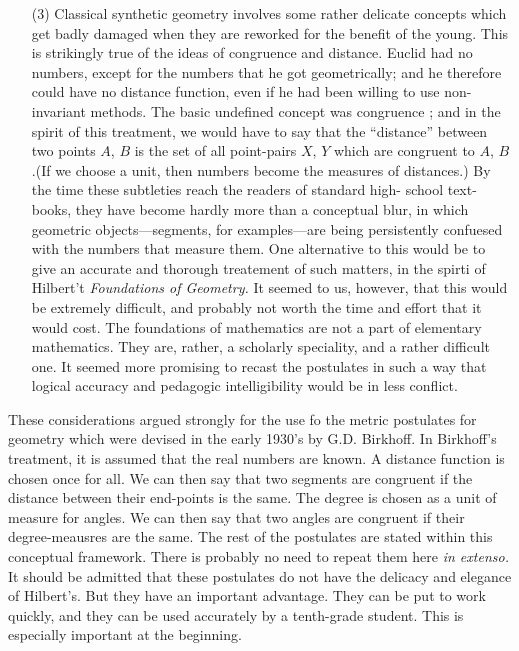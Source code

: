 \begin{itemize}
\item[(3)] Classical synthetic geometry involves some rather delicate
  concepts which get badly damaged when they are reworked for the
  benefit of the young. This is strikingly true of the ideas of
  congruence and distance. Euclid had no numbers, except for the
  numbers that he got geometrically; and he therefore could have no
  distance function, even if he had been willing to use non-invariant
  methods. The basic undefined concept was congruence ; and in the
  spirit of this treatment, we would have to say that the ``distance''
  between two points $A$, $B$ is the set of all point-pairs $X$, $Y$
  which are congruent to $A$, $B$.\pageoriginale (If we choose a unit,
  then numbers become the measures of distances.) By the time these
  subtleties reach the readers of standard high- school text-books,
  they have become hardly more than a conceptual blur, in which
  geometric objects---segments, for examples---are  being
  persistently confuesed with the numbers that measure them. One
  alternative to this would be to give an accurate and thorough
  treatement of such matters, in the spirti of Hilbert't
  \textit{Foundations of Geometry.} It seemed to us, however, that
  this would be extremely difficult, and probably not worth the time
  and effort that it would cost. The foundations of mathematics are
  not a part of elementary mathematics. They are, rather, a scholarly
  speciality, and a rather difficult one. It seemed more promising to
  recast the postulates in such a way that logical accuracy and
  pedagogic intelligibility would be in less conflict.
\end{itemize}

These considerations argued strongly for the use fo the metric
postulates for geometry which were devised in the early 1930's by
G.D. Birkhoff. In Birkhoff's treatment, it is assumed that the real
numbers are known. A distance function is chosen once for all. We can
then say that two segments are congruent if the distance between their
end-points is the same. The degree is chosen as a unit of measure for
angles. We can then say that two angles are congruent if their
degree-meausres are the same. The rest of the postulates are stated
within this conceptual framework. There is probably no need to repeat
them here \textit{in extenso.} It should be admitted that these
postulates do not have the delicacy and elegance of Hilbert's. But
they have an important advantage. They can be put to work quickly, and
they can be used accurately by a tenth-grade student. This is
especially important at the beginning.

